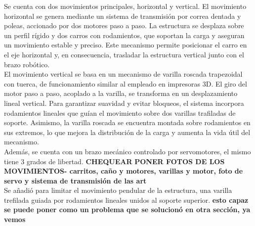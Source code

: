 Se cuenta con dos movimientos principales, horizontal y vertical. El movimiento horizontal se genera mediante un sistema de transmisión por correa dentada y poleas, accionado por dos motores paso a paso. La estructura se desplaza sobre un perfil rígido y dos carros con rodamientos, que soportan la carga y aseguran un movimiento estable y preciso. Este mecanismo permite posicionar el carro en el eje horizontal y, en consecuencia, trasladar la estructura vertical junto con el brazo robótico.\\
El movimiento vertical se basa en un mecanismo de varilla roscada trapezoidal con tuerca, de funcionamiento similar al empleado en impresoras 3D. El giro del motor paso a paso, acoplado a la varilla, se transforma en un desplazamiento lineal vertical. Para garantizar suavidad y evitar bloqueos, el sistema incorpora rodamientos lineales que guían el movimiento sobre dos varillas trafiladas de soporte. Asimismo, la varilla roscada se encuentra montada sobre rodamientos en sus extremos, lo que mejora la distribución de la carga y aumenta la vida útil del mecanismo.\\
Además, se cuenta con un brazo mecánico controlado por servomotores, el mismo tiene 3 grados de libertad. \textbf{CHEQUEAR}
\textbf{PONER FOTOS DE LOS MOVIMIENTOS- carritos, caño y motores, varillas y motor, foto de servo y sistema de transmisión de las art}\\
Se añadió para limitar el movimiento pendular de la estructura, una varilla trefilada guiada por rodamientos lineales unidos al soporte superior. \textbf{esto capaz se puede poner como un problema que se solucionó en otra sección, ya vemos}\\